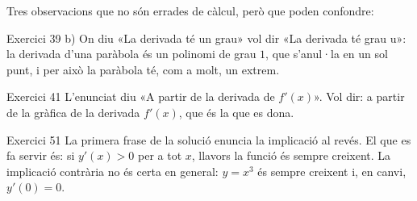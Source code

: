 
\ifobs
\bigskip
\noindent
Tres observacions que no són errades de càlcul, però que poden confondre:\par\nopagebreak

\begin{observacio}{Exercici 39 b)}
  On diu «La derivada té un grau» vol dir «La derivada té grau u»: la derivada
  d'una paràbola és un polinomi de grau $1$, que s'anul·la en un sol punt, i
  per això la paràbola té, com a molt, un extrem.
\end{observacio}

\begin{observacio}{Exercici 41}
  L'enunciat diu «A partir de la derivada de $f'(x)$». Vol dir: a partir de la
  gràfica de la derivada $f'(x)$, que és la que es dona.
\end{observacio}

\begin{observacio}{Exercici 51}
  La primera frase de la solució enuncia la implicació al revés. El que es fa
  servir és: si $y'(x)>0$ per a tot $x$, llavors la funció és sempre creixent.
  La implicació contrària no és certa en general: $y=x^3$ és sempre creixent
  i, en canvi, $y'(0)=0$.
\end{observacio}
\fi
